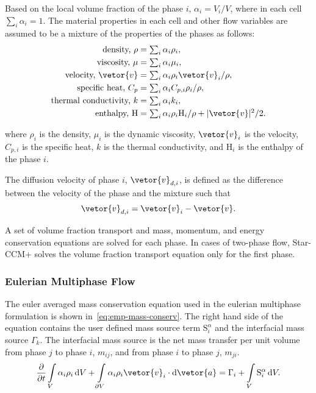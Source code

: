 Based on the local volume fraction of the phase $i$, $\alpha_{i} = V_{i}/V$, where in each cell $\textstyle\sum\nolimits_{i} \alpha_{i} = 1$.
The material properties in each cell and other flow variables are assumed to be a mixture of the properties of the phases as follows:
\begin{subequations}\label{eq_vof_defs}
\begin{align}
\text{density, } \rho &= \textstyle\sum\nolimits_{i} \alpha_{i} \rho_{i},\\
\text{viscosity, } \mu &= \textstyle\sum\nolimits_{i} \alpha_{i} \mu_{i},\\
\text{velocity, } \vetor{v} &= \textstyle\sum\nolimits_{i} \alpha_{i} \rho_{i} \vetor{v}_{i}/ \rho,\\
\text{specific heat, } C_{p} &= \textstyle\sum\nolimits_{i} \alpha_{i} C_{p,i} \rho_{i}/\rho,\\
\text{thermal conductivity, } k &= \textstyle\sum\nolimits_{i} \alpha_{i} k_{i},\\
\text{enthalpy, } \mathrm{H} &= \textstyle\sum\nolimits_{i} \alpha_{i} \rho_{i} \mathrm{H}_{i}/\rho + |\vetor{v}|^{2}/2.
\end{align}
\end{subequations}

\noindent where $\rho_{i}$ is the density, $\mu_{i}$ is the dynamic viscosity,
$\vetor{v}_{i}$ is the velocity, $C_{p,i}$ is the specific heat, $k$ is the thermal conductivity, and $\mathrm{H}_{i}$ is the enthalpy of the phase $i$.

The diffusion velocity of phase $i$, $\vetor{v}_{d,i}$, is defined as the difference between the velocity of the phase and the mixture
such that \[\vetor{v}_{d,i} = \vetor{v}_{i} - \vetor{v}.\]

A set of volume fraction transport and mass, momentum, and energy conservation equations are solved for each phase.
In cases of two-phase flow, Star-CCM+ solves the volume fraction transport equation only for the first phase.

\subsubsection{Eulerian Multiphase Flow}
The euler averaged mass conservation equation used in the eulerian 
 multiphase formulation is shown in~\ref{eq:emp-mass-conserv}. 
 The right hand side of the equation contains the user defined mass
 source term $\mathrm{S}^{\alpha}_{i}$ and the interfacial mass
 source $\Gamma_k$. The interfacial mass source is the net 
 mass transfer per unit volume from phase $j$ to phase $i$, $m_{ij}$, 
 and from phase $i$ to phase $j$, $m_{ji}$. 
\begin{equation}\label{eq:emp-mass-conserv}
\frac{\partial}{\partial t}
\int\limits_{V} \alpha_{i} \rho_{i} \,\mathrm{d}V
+ \int\limits_{\partial V} \alpha_{i} \rho_{i} \vetor{v}_{i} \cdot \mathrm{d}\vetor{a}
= \Gamma_{i}
+ \int\limits_{V} \mathrm{S}^{\alpha}_{i} \,\mathrm{d}V.
\end{equation}


